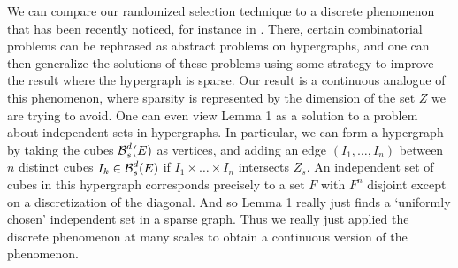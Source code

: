 We can compare our randomized selection technique to a discrete phenomenon that has been recently noticed, for instance in \cite{BaloghMorrisSamotij}. There, certain combinatorial problems can be rephrased as abstract problems on hypergraphs, and one can then generalize the solutions of these problems using some strategy to improve the result where the hypergraph is sparse. Our result is a continuous analogue of this phenomenon, where sparsity is represented by the dimension of the set $Z$ we are trying to avoid. One can even view Lemma 1 as a solution to a problem about independent sets in hypergraphs. In particular, we can form a hypergraph by taking the cubes $\operatorname{\mathcal{B}}^d_s(E)$ as vertices, and adding an edge $(I_1, \dots, I_n)$ between $n$ distinct cubes $I_k \in \operatorname{\mathcal{B}}^d_s(E)$ if $I_1 \times \dots \times I_n$ intersects $Z_s$. An independent set of cubes in this hypergraph corresponds precisely to a set $F$ with $F^n$ disjoint except on a discretization of the diagonal. And so Lemma 1 really just finds a `uniformly chosen' independent set in a sparse graph. Thus we really just applied the discrete phenomenon at many scales to obtain a continuous version of the phenomenon.

\endinput